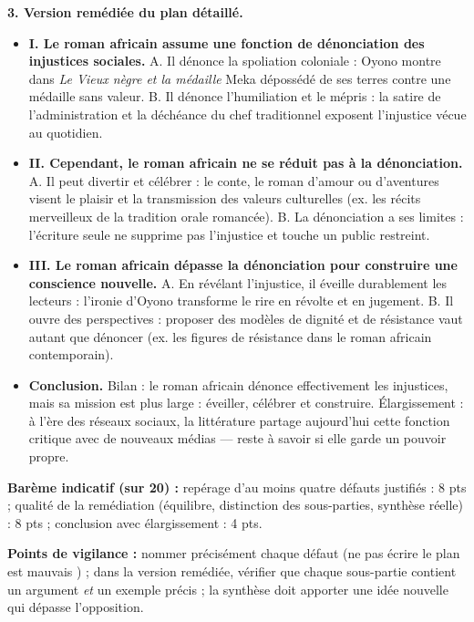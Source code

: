 \documentclass[11pt]{article}
\begin{document}
\begin{corrige}
\textbf{3. Version remédiée du plan détaillé.}
\begin{itemize}
\item \textbf{I. Le roman africain assume une fonction de dénonciation des injustices sociales.} A. Il dénonce la spoliation coloniale : Oyono montre dans \emph{Le Vieux nègre et la médaille} Meka dépossédé de ses terres contre une médaille sans valeur. B. Il dénonce l'humiliation et le mépris : la satire de l'administration et la déchéance du chef traditionnel exposent l'injustice vécue au quotidien.
\item \textbf{II. Cependant, le roman africain ne se réduit pas à la dénonciation.} A. Il peut divertir et célébrer : le conte, le roman d'amour ou d'aventures visent le plaisir et la transmission des valeurs culturelles (ex. les récits merveilleux de la tradition orale romancée). B. La dénonciation a ses limites : l'écriture seule ne supprime pas l'injustice et touche un public restreint.
\item \textbf{III. Le roman africain dépasse la dénonciation pour construire une conscience nouvelle.} A. En révélant l'injustice, il éveille durablement les lecteurs : l'ironie d'Oyono transforme le rire en révolte et en jugement. B. Il ouvre des perspectives : proposer des modèles de dignité et de résistance vaut autant que dénoncer (ex. les figures de résistance dans le roman africain contemporain).
\item \textbf{Conclusion.} Bilan : le roman africain dénonce effectivement les injustices, mais sa mission est plus large : éveiller, célébrer et construire. Élargissement : à l'ère des réseaux sociaux, la littérature partage aujourd'hui cette fonction critique avec de nouveaux médias — reste à savoir si elle garde un pouvoir propre.
\end{itemize}

\textbf{Barème indicatif (sur 20) :} repérage d'au moins quatre défauts justifiés : 8 pts ; qualité de la remédiation (équilibre, distinction des sous-parties, synthèse réelle) : 8 pts ; conclusion avec élargissement : 4 pts.

\textbf{Points de vigilance :} nommer précisément chaque défaut (ne pas écrire \og le plan est mauvais \fg{}) ; dans la version remédiée, vérifier que chaque sous-partie contient un argument \emph{et} un exemple précis ; la synthèse doit apporter une idée nouvelle qui dépasse l'opposition.
\end{corrige}

\newpage
\end{document}
